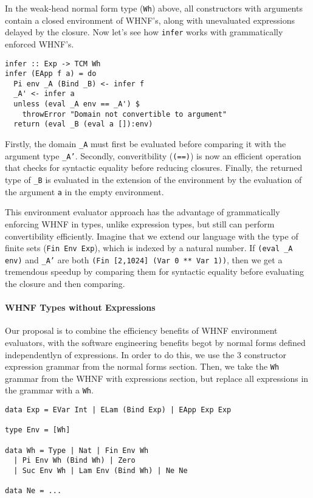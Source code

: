 \documentclass[preprint,authoryear]{sigplanconf}
\begin{document}
In the weak-head normal form type (\texttt{Wh}) above, all
constructors with arguments contain a closed environment of WHNF's,
along with unevaluated expressions delayed by the closure. 
Now let's see how \texttt{infer} works with grammatically enforced
WHNF's.

\begin{verbatim}
infer :: Exp -> TCM Wh
infer (EApp f a) = do
  Pi env _A (Bind _B) <- infer f
  _A' <- infer a
  unless (eval _A env == _A') $
    throwError "Domain not convertible to argument"
  return (eval _B (eval a []):env)
\end{verbatim}

Firstly, the domain \texttt{\_A} must first be evaluated before comparing it
with the argument type \texttt{\_A'}. Secondly, converitbility
(\texttt{(==)}) is now an efficient operation that checks for
syntactic equality before reducing closures. Finally, the returned
type of \texttt{\_B} is evaluated in the extension of the environment
by the evaluation of the argument \texttt{a} in the empty environment.

This environment evaluator approach has the advantage of grammatically
enforcing WHNF in types, unlike expression types, but still can
perform convertibility efficiently. Imagine that we extend our
language with the type of finite sets (\texttt{Fin Env Exp}), which is
indexed by a natural number. If \texttt{(eval \_A env)} and \texttt{\_A'}
are both \texttt{(Fin [2,1024] (Var 0 ** Var 1))}, then we get a
tremendous speedup by comparing them for syntactic equality before evaluating
the closure and then comparing.

\paragraph{WHNF Types without Expressions}

Our proposal is to combine the efficiency benefits of WHNF environment
evaluators, with the software engineering benefits begot by
normal forms defined independentlyn of expressions. In order to do
this, we use the 3 constructor expression grammar from the normal
forms section. Then, we take the \texttt{Wh} grammar from the WHNF
with expressions section, but replace all expressions in the grammar
with a \texttt{Wh}.

\begin{verbatim}
data Exp = EVar Int | ELam (Bind Exp) | EApp Exp Exp

type Env = [Wh]

data Wh = Type | Nat | Fin Env Wh
  | Pi Env Wh (Bind Wh) | Zero
  | Suc Env Wh | Lam Env (Bind Wh) | Ne Ne

data Ne = ...
\end{verbatim}
\end{document}
